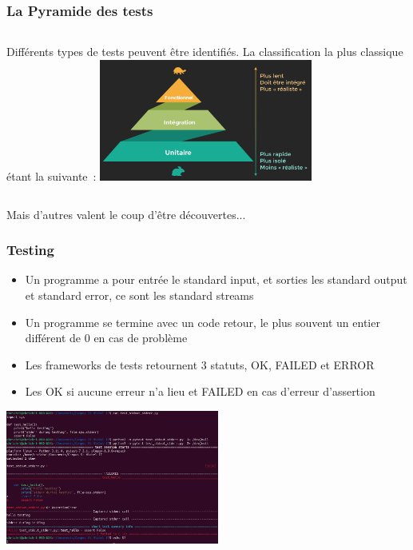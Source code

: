 \documentclass{beamer}
\begin{document}
    \begin{frame}
        \transdissolve
        \frametitle{La Pyramide des tests}
        \begin{columns}
            Différents types de tests peuvent être identifiés.
            La classification la plus classique étant la suivante\footnotemark~:
            \centering
            \includegraphics[width=7cm]{image/classic-test-pyramid.png}
        \end{columns}
        \bigbreak
        Mais d'autres valent le coup d'être découvertes...

    \end{frame}

    \begin{frame}
        \transdissolve
        \frametitle{Testing}

        \begin{itemize}

            \item Un programme a pour entrée le standard input, et sorties les standard output et standard error, ce sont les standard streams
            \item Un programme se termine avec un code retour, le plus souvent un entier différent de 0 en cas de problème
            \item Les frameworks de tests retournent 3 statuts, OK, FAILED et ERROR
            \item Les OK si aucune erreur n'a lieu et FAILED en cas d'erreur d'assertion

        \end{itemize}

        \bigbreak

        \centering
        \includegraphics[width=7cm]{image/terminal-test-report.png}

    \end{frame}
\end{document}

